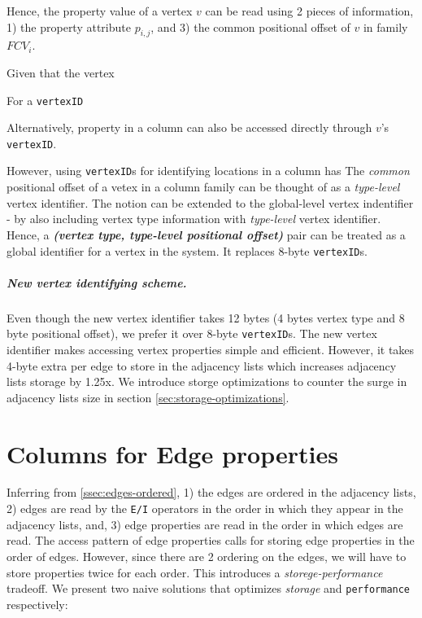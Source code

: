 Hence, the property value of a vertex $v$ can be read using 2 pieces of information, 1) the property attribute $p_{i,j}$, and 3) the common positional offset of $v$ in family $FCV_i$. 



Given that the vertex

For a \texttt{vertexID} 

Alternatively, property in a column can also be accessed directly through $v$'s \texttt{vertexID}. 

However, using \texttt{vertexID}s for identifying locations in a column has 
The \emph{common} positional offset of a vetex in a column family can be thought of as a \emph{type-level} vertex identifier. The notion can be extended to the global-level vertex indentifier - by also including vertex type information with \emph{type-level} vertex identifier. Hence, a \emph{\textbf{(vertex type, type-level positional offset)}} pair can be treated as a global identifier for a vertex in the system. It replaces 8-byte \texttt{vertexID}s. 

\vspace{-12pt}
\subparagraph{New vertex identifying scheme.}Even though the new vertex identifier takes 12 bytes (4 bytes vertex type and 8 byte positional offset), we prefer it over 8-byte \texttt{vertexID}s. The new vertex identifier makes accessing vertex properties simple and efficient. However, it takes 4-byte extra per edge to store in the adjacency lists which increases adjacency lists storage by 1.25x. We introduce storge optimizations to counter the surge in adjacency lists size in section \ref{sec:storage-optimizations}.

\section{Columns for Edge properties}
\label{sec:edge-property-columns}

Inferring from \ref{ssec:edges-ordered}, 1) the edges are ordered in the adjacency lists, 2) edges are read by the \texttt{E/I} operators in the order in which they appear in the adjacency lists, and, 3) edge properties are read in the order in which edges are read. The access pattern of edge properties calls for storing edge properties in the order of edges. However, since there are 2 ordering on the edges, we will have to store properties twice for each order. This introduces a \emph{storege-performance} tradeoff. We present two naive solutions that optimizes \emph{storage} and \texttt{performance} respectively:

